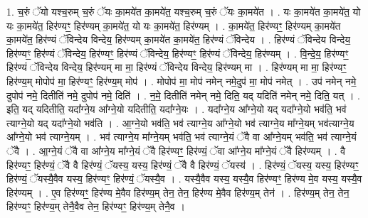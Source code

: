 \documentclass[17pt]{extarticle}
\begin{document}
1. च॒रुं ॅयो यश्च॒रुम् च॒रुं ॅयः का॒मये॑त का॒मये॑त॒ यश्च॒रुम् च॒रुं ॅयः का॒मये॑त । . यः का॒मये॑त का॒मये॑त॒ यो यः का॒मये॑त॒ हिर॑ण्यꣳ॒॒ हिर॑ण्यम् का॒मये॑त॒ यो यः का॒मये॑त॒ हिर॑ण्यम् । . का॒मये॑त॒ हिर॑ण्यꣳ॒॒ हिर॑ण्यम् का॒मये॑त का॒मये॑त॒ हिर॑ण्यं ॅविन्देय विन्देय॒ हिर॑ण्यम् का॒मये॑त का॒मये॑त॒ हिर॑ण्यं ॅविन्देय । . हिर॑ण्यं ॅविन्देय विन्देय॒ हिर॑ण्यꣳ॒॒ हिर॑ण्यं ॅविन्देय॒ हिर॑ण्यꣳ॒॒ हिर॑ण्यं ॅविन्देय॒ हिर॑ण्यꣳ॒॒ हिर॑ण्यं ॅविन्देय॒ हिर॑ण्यम् । . वि॒न्दे॒य॒ हिर॑ण्यꣳ॒॒ हिर॑ण्यं ॅविन्देय विन्देय॒ हिर॑ण्यम् मा मा॒ हिर॑ण्यं ॅविन्देय विन्देय॒ हिर॑ण्यम् मा । . हिर॑ण्यम् मा मा॒ हिर॑ण्यꣳ॒॒ हिर॑ण्य॒म् मोपोप॑ मा॒ हिर॑ण्यꣳ॒॒ हिर॑ण्य॒म् मोप॑ । . मोपोप॑ मा॒ मोप॑ नमेन् नमे॒दुप॑ मा॒ मोप॑ नमेत् । . उप॑ नमेन् नमे॒ दुपोप॑ नमे॒ दितीति॑ नमे॒ दुपोप॑ नमे॒ दिति॑ । . न॒मे॒ दितीति॑ नमेन् नमे॒ दिति॒ यद् यदिति॑ नमेन् नमे॒ दिति॒ यत् । . इति॒ यद् यदितीति॒ यदा᳚ग्ने॒य आ᳚ग्ने॒यो यदितीति॒ यदा᳚ग्ने॒यः । . यदा᳚ग्ने॒य आ᳚ग्ने॒यो यद् यदा᳚ग्ने॒यो भव॑ति॒ भव॑ त्याग्ने॒यो यद् यदा᳚ग्ने॒यो भव॑ति । . आ॒ग्ने॒यो भव॑ति॒ भव॑ त्याग्ने॒य आ᳚ग्ने॒यो भव॑ त्याग्ने॒य मा᳚ग्ने॒यम् भव॑त्याग्ने॒य आ᳚ग्ने॒यो भव॑ त्याग्ने॒यम् । . भव॑ त्याग्ने॒य मा᳚ग्ने॒यम् भव॑ति॒ भव॑ त्याग्ने॒यं ॅवै वा आ᳚ग्ने॒यम् भव॑ति॒ भव॑ त्याग्ने॒यं ॅवै । . आ॒ग्ने॒यं ॅवै वा आ᳚ग्ने॒य मा᳚ग्ने॒यं ॅवै हिर॑ण्यꣳ॒॒ हिर॑ण्यं॒ ॅवा आ᳚ग्ने॒य मा᳚ग्ने॒यं ॅवै हिर॑ण्यम् । . वै हिर॑ण्यꣳ॒॒ हिर॑ण्यं॒ ॅवै वै हिर॑ण्यं॒ ॅयस्य॒ यस्य॒ हिर॑ण्यं॒ ॅवै वै हिर॑ण्यं॒ ॅयस्य॑ । . हिर॑ण्यं॒ ॅयस्य॒ यस्य॒ हिर॑ण्यꣳ॒॒ हिर॑ण्यं॒ ॅयस्यै॒वैव यस्य॒ हिर॑ण्यꣳ॒॒ हिर॑ण्यं॒ ॅयस्यै॒व । . यस्यै॒वैव यस्य॒ यस्यै॒व हिर॑ण्यꣳ॒॒ हिर॑ण्य मे॒व यस्य॒ यस्यै॒व हिर॑ण्यम् । . ए॒व हिर॑ण्यꣳ॒॒ हिर॑ण्य मे॒वैव हिर॑ण्य॒म् तेन॒ तेन॒ हिर॑ण्य मे॒वैव हिर॑ण्य॒म् तेन॑ । . हिर॑ण्य॒म् तेन॒ तेन॒ हिर॑ण्यꣳ॒॒ हिर॑ण्य॒म् तेनै॒वैव तेन॒ हिर॑ण्यꣳ॒॒ हिर॑ण्य॒म् तेनै॒व । \newline
\end{document}

